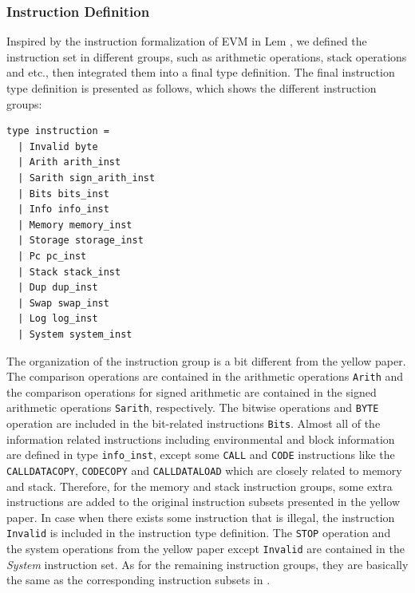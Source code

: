 \documentclass[runningheads]{llncs}
\begin{document}
\subsubsection{Instruction Definition}
Inspired by the instruction formalization of EVM in Lem \cite{hirai2017defining}, we defined the instruction set in different groups, such as arithmetic operations, stack operations and etc., then integrated them into a final type definition. The final instruction type definition is presented as follows, which shows the different instruction groups:
\begin{verbatim}
type instruction =
  | Invalid byte
  | Arith arith_inst  
  | Sarith sign_arith_inst
  | Bits bits_inst
  | Info info_inst
  | Memory memory_inst
  | Storage storage_inst
  | Pc pc_inst
  | Stack stack_inst
  | Dup dup_inst
  | Swap swap_inst
  | Log log_inst
  | System system_inst
\end{verbatim}
The organization of the instruction group is a bit different from the yellow paper\cite{wood2014ethereum}. The comparison operations are contained in the arithmetic operations \texttt{Arith} and the comparison operations for signed arithmetic are contained in the signed arithmetic operations \texttt{Sarith}, respectively. The bitwise operations and \texttt{BYTE} operation are included in the bit-related instructions \texttt{Bits}. Almost all of the information related instructions including environmental and block information are defined in type \texttt{info\_inst}, except some \texttt{CALL} and \texttt{CODE} instructions like the \texttt{CALLDATACOPY}, \texttt{CODECOPY} and \texttt{CALLDATALOAD} which are closely related to memory and stack. Therefore, for the memory and stack instruction groups, some extra instructions are added to the original instruction subsets presented in the yellow paper. In case when there exists some instruction that is illegal, the instruction \texttt{Invalid} is included in the instruction type definition. The \texttt{STOP} operation and the system operations from the yellow paper except \texttt{Invalid} are contained in the \textit{System} instruction set. As for the remaining instruction groups, they are basically the same as the corresponding instruction subsets in \cite{wood2014ethereum}. 
\end{document}
